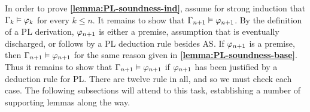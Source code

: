 In order to prove \textbf{\ref{lemma:PL-soundness-ind}}, assume for strong induction that $\Gamma_k \vDash \varphi_k$ for every $k\leq n$. 
It remains to show that $\Gamma_{n+1} \vDash \varphi_{n+1}$.
By the definition of a PL derivation, $\varphi_{n+1}$ is either a premise, assumption that is eventually discharged, or follows by a PL deduction rule besides AS. 
If $\varphi_{n+1}$ is a premise, then $\Gamma_{n+1} \vDash \varphi_{n+1}$ for the same reason given in \textbf{\ref{lemma:PL-soundness-base}}.
Thus it remains to show that $\Gamma_{n+1} \vDash \varphi_{n+1}$ if $\varphi_{n+1}$ has been justified by a deduction rule for PL. 
%
%
%
%
There are twelve rule in all, and so we must check each case.
The following subsections will attend to this task, establishing a number of supporting lemmas along the way.






